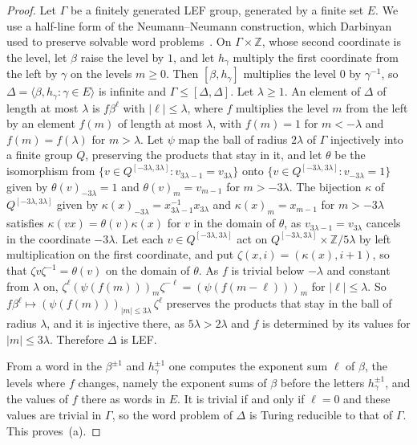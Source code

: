\documentclass[11pt]{amsart}
\newcommand{\Z}{\mathbb Z}
\begin{document}
\begin{proof}
Let $\Gamma$ be a finitely generated LEF group, generated by a finite set
$E$. We use a half-line form of the Neumann--Neumann construction, which
Darbinyan used to preserve solvable word problems~\cite{Darbinyan15}. On
$\Gamma\times\Z$, whose second coordinate is the level, let $\beta$ raise
the level by $1$, and let $h_\gamma$ multiply the first coordinate from the
left by $\gamma$ on the levels $m\ge0$. Then $[\beta,h_\gamma]$ multiplies
the level $0$ by $\gamma^{-1}$, so
$\Delta=\langle\beta,h_\gamma:\gamma\in E\rangle$ is infinite and
$\Gamma\le[\Delta,\Delta]$. Let $\lambda\ge1$. An element of $\Delta$ of
length at most $\lambda$ is $f\beta^\ell$ with $|\ell|\le\lambda$, where $f$ multiplies the
level $m$ from the left by an element $f(m)$ of length at most $\lambda$,
with $f(m)=1$ for $m<-\lambda$ and $f(m)=f(\lambda)$ for $m>\lambda$. Let
$\psi$ map the ball of radius $2\lambda$ of $\Gamma$ injectively into a
finite group $Q$, preserving the products that stay in it, and let $\theta$
be the isomorphism from $\{v\in Q^{[-3\lambda,3\lambda]}:v_{3\lambda-1}=v_{3\lambda}\}$
onto $\{v\in Q^{[-3\lambda,3\lambda]}:v_{-3\lambda}=1\}$ given by
$\theta(v)_{-3\lambda}=1$ and $\theta(v)_m=v_{m-1}$ for $m>-3\lambda$. The
bijection $\kappa$ of $Q^{[-3\lambda,3\lambda]}$ given by
$\kappa(x)_{-3\lambda}=x_{3\lambda-1}^{-1}x_{3\lambda}$ and
$\kappa(x)_m=x_{m-1}$ for $m>-3\lambda$ satisfies
$\kappa(vx)=\theta(v)\kappa(x)$ for $v$ in the domain of $\theta$, as
$v_{3\lambda-1}=v_{3\lambda}$ cancels in the coordinate $-3\lambda$. Let
each $v\in Q^{[-3\lambda,3\lambda]}$ act on
$Q^{[-3\lambda,3\lambda]}\times\Z/5\lambda$ by left multiplication on the
first coordinate, and put $\zeta(x,i)=(\kappa(x),i+1)$, so that
$\zeta v\zeta^{-1}=\theta(v)$ on the domain of $\theta$. As $f$ is trivial
below $-\lambda$ and constant from $\lambda$ on,
$\zeta^\ell(\psi(f(m)))_m\zeta^{-\ell}=(\psi(f(m-\ell)))_m$ for
$|\ell|\le\lambda$. So $f\beta^\ell\mapsto(\psi(f(m)))_{|m|\le3\lambda}\,\zeta^\ell$
preserves the products that stay in the ball of radius $\lambda$, and it is
injective there, as $5\lambda>2\lambda$ and $f$ is determined by its values
for $|m|\le3\lambda$. Therefore $\Delta$ is LEF.

From a word in the $\beta^{\pm1}$ and $h_\gamma^{\pm1}$ one computes the
exponent sum $\ell$ of $\beta$, the levels where $f$ changes, namely the
exponent sums of $\beta$ before the letters $h_\gamma^{\pm1}$, and the
values of $f$ there as words in $E$. It is trivial if and only if $\ell=0$
and these values are trivial in $\Gamma$, so the word problem of $\Delta$
is Turing reducible to that of $\Gamma$. This proves~(a).


\end{proof}
\end{document}
